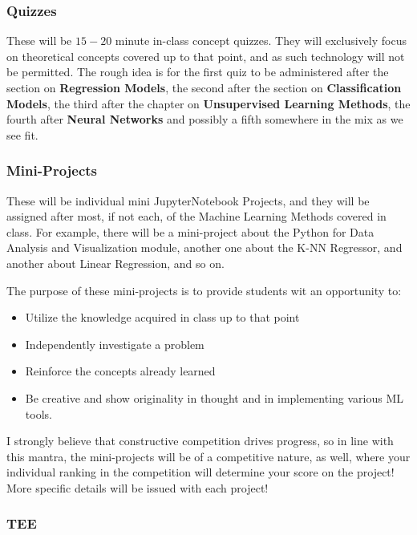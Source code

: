 \documentclass[11pt]{article}
\theoremstyle{plain}
\theoremstyle{definition}
\begin{document}
\subsubsection{Quizzes}

These will be $15-20$ minute in-class concept quizzes. They will exclusively focus on theoretical concepts covered up to that point, and as such technology will not be permitted. The rough idea is for the first quiz to be administered after the section on {\bf Regression Models}, the second after the section on {\bf Classification Models}, the third after the chapter on {\bf Unsupervised Learning Methods}, the fourth after {\bf Neural Networks} and possibly a fifth somewhere in the mix as we see fit. 

\subsubsection{Mini-Projects}

These will be individual mini JupyterNotebook Projects, and they will be assigned after most, if not each, of the Machine Learning Methods covered in class. For example, there will be a mini-project about the Python for Data Analysis and Visualization module, another one about the K-NN Regressor, and another about Linear Regression, and so on. 

\vskip 8pt

The purpose of these mini-projects is to provide students wit an opportunity to:

\begin{itemize}
\item Utilize the knowledge acquired in class up to that point
\item  Independently investigate a problem
\item Reinforce the concepts already learned
\item Be creative and show originality in thought and in implementing various ML tools.
\end{itemize}

I strongly believe that constructive competition drives progress, so in line with this mantra, the mini-projects will be of a competitive nature, as well, where your individual ranking in the competition will determine your score on the project! More specific details will be issued with each project! 

\subsubsection{TEE}
\end{document}

